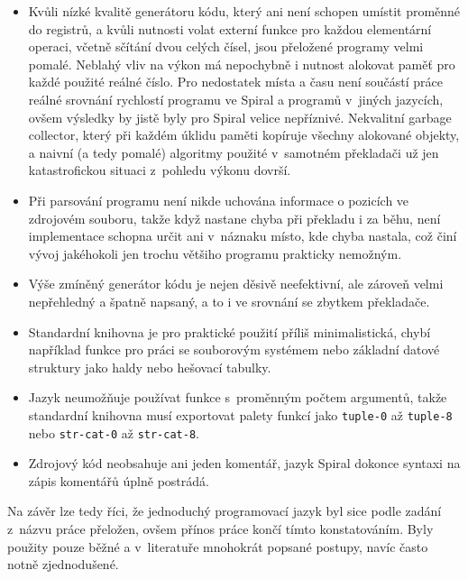 \begin{itemize}
  \item Kvůli nízké kvalitě generátoru kódu, který ani není schopen umístit
    proměnné do registrů, a kvůli nutnosti volat externí funkce pro každou
    elementární operaci, včetně sčítání dvou celých čísel, jsou přeložené programy
    velmi pomalé. Neblahý vliv na výkon má nepochybně i nutnost alokovat paměť pro
    každé použité reálné číslo. Pro nedostatek místa a času není součástí práce
    reálné srovnání rychlostí programu ve Spiral a programů v~jiných jazycích,
    ovšem výsledky by jistě byly pro Spiral velice nepříznivé. Nekvalitní garbage
    collector, který při každém úklidu paměti kopíruje všechny alokované objekty,
    a naivní (a tedy pomalé) algoritmy použité v~samotném překladači už jen
    katastrofickou situaci z~pohledu výkonu dovrší.

  \item Při parsování programu není nikde uchována informace o pozicích ve
    zdrojovém souboru, takže když nastane chyba při překladu i za běhu, není
    implementace schopna určit ani v~náznaku místo, kde chyba nastala, což činí
    vývoj jakéhokoli jen trochu většiho programu prakticky nemožným.

  \item Výše zmíněný generátor kódu je nejen děsivě neefektivní, ale zároveň
    velmi nepřehledný a špatně napsaný, a to i ve srovnání se zbytkem
    překladače.

  \item Standardní knihovna je pro praktické použití příliš minimalistická,
    chybí například funkce pro práci se souborovým systémem nebo základní datové
    struktury jako haldy nebo hešovací tabulky.

  \item Jazyk neumožňuje používat funkce s~proměnným počtem argumentů, takže
    standardní knihovna musí exportovat palety funkcí jako \texttt{tuple-0} až
    \texttt{tuple-8} nebo \texttt{str-cat-0} až \texttt{str-cat-8}.

  \item Zdrojový kód neobsahuje ani jeden komentář, jazyk Spiral dokonce syntaxi
    na zápis komentářů úplně postrádá.
\end{itemize}

Na závěr lze tedy říci, že jednoduchý programovací jazyk byl sice podle zadání
z~názvu práce přeložen, ovšem přínos práce končí tímto konstatováním. Byly
použity pouze běžné a v~literatuře mnohokrát popsané postupy, navíc často notně
zjednodušené.
